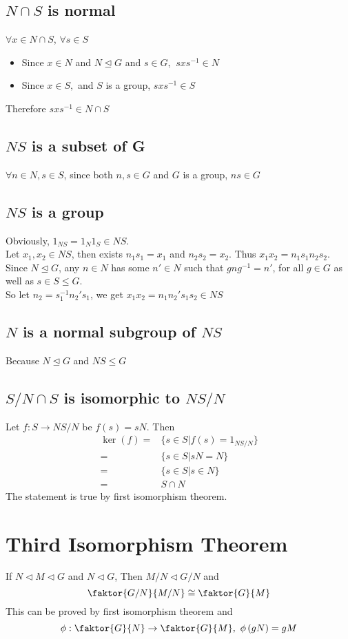 \documentclass{article}
\begin{document}
	\subsection*{$N\cap S$ is normal}
	$\forall x\in N\cap S$, $\forall s\in S$\begin{itemize}
		\item Since $x\in N$ and $N\trianglelefteq G$ and $s\in G$, $\ sxs^{-1}\in N$
		\item Since $x\in S,$ and $S$ is a group, $sxs^{-1}\in S$
	\end{itemize}
	Therefore $sxs^{-1}\in N\cap S$
	\subsection*{$NS$ is a subset of G}
	$\forall n\in N,s\in S$, since both $n,s\in G$ and $G$ is a group, $ns\in G$
	\subsection*{$NS$ is a group}
	Obviously, $1_{NS}=1_N1_S\in NS$.\\
	Let $x_1,x_2\in NS$, then exists $n_1s_1=x_1$ and $n_2s_2=x_2$. Thus $x_1x_2=n_1s_1n_2s_2$.\\
	Since $N\trianglelefteq G$, any $n\in N$ has some $n'\in N$ such that $gng^{-1}=n'$, for all $g\in G$ as well as $s\in S\leq G$.\\
	So let $n_2=s_1^{-1}n_2's_1$, we get $x_1x_2=n_1n_2's_1s_2\in NS$
	\subsection*{$N$ is a normal subgroup of $NS$ }
	Because $N\trianglelefteq G$ and $NS\leq G$
	\subsection*{$S/N\cap S$ is isomorphic to $NS/N$}
	Let $f:S\rightarrow NS/N$ be $f(s)=sN$. Then\begin{align*}
		\ker(f) =& \{s\in S|f(s)=1_{NS/N}\}\\
		=&\{s\in S|sN=N\}\\
		=&\{s\in S|s\in N\}\\
		=&S\cap N
	\end{align*}
	The statement is true by first isomorphism theorem.
	
	\section*{Third Isomorphism Theorem}
	If $N\triangleleft M\triangleleft G$ and $N\triangleleft G$,
	Then $M/N \triangleleft G/N$ and $$
	\faktor{G/N}{M/N}\cong\faktor{G}{M}
	$$
	This can be proved by first isomorphism theorem and$$
	\phi:\faktor{G}{N}\rightarrow\faktor{G}{M},\ \phi\left(gN\right)=gM$$
\end{document}
